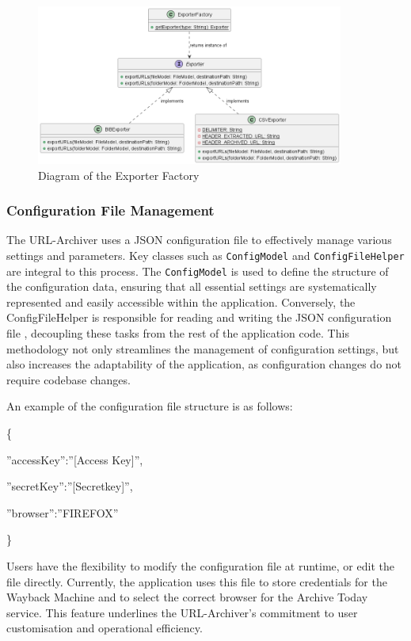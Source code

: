 \begin{figure}[h!]
    \center
    \includegraphics[width=0.9\textwidth]{pictures/ExporterFactory-0.png}
    \caption{Diagram of the Exporter Factory}
    \label{fig:ExporterFactory_Diagram}
\end{figure}
\clearpage

\subsubsection{Configuration File Management}
The URL-Archiver uses a JSON configuration file  to effectively manage various settings and parameters. Key classes such as \texttt{ConfigModel} and \texttt{ConfigFileHelper} are integral to this process. The \texttt{ConfigModel} is used to define the structure of the configuration data, ensuring that all essential settings are systematically represented and easily accessible within the application. Conversely, the ConfigFileHelper is responsible for reading and writing the JSON configuration file , decoupling these tasks from the rest of the application code. This methodology not only streamlines the management of configuration settings, but also increases the adaptability of the application, as configuration changes do not require codebase changes.

An example of the configuration file  structure is as follows:

\{

\quad''accessKey'':''[Access Key]'',

\quad''secretKey'':''[Secretkey]'',

\quad''browser'':''FIREFOX''

\}

Users have the flexibility to modify the configuration file  at runtime, or edit the file directly. Currently, the application uses this file to store credentials for the Wayback Machine and to select the correct browser for the Archive Today service. This feature underlines the URL-Archiver's commitment to user customisation and operational efficiency.

